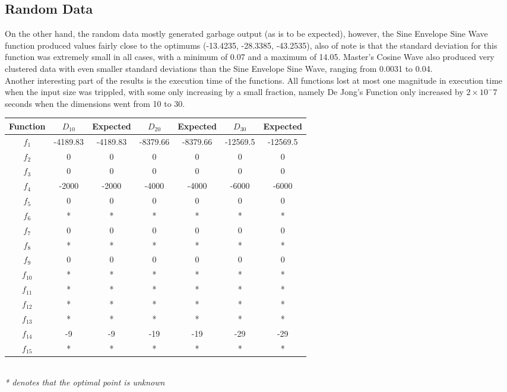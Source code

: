 \documentclass[paper=a4, fontsize=11pt]{scrartcl} %
\numberwithin{equation}{section} %
\numberwithin{figure}{section} %
\numberwithin{table}{section} %
\begin{document}
	\subsection{Random Data}
	On the other hand, the random data mostly generated garbage output (as is to be expected), however, the Sine Envelope Sine Wave function produced values fairly close to the optimums (-13.4235, -28.3385, -43.2535), also of note is that the standard deviation for this function was extremely small in all cases, with a minimum of 0.07 and a maximum of 14.05. Master's Cosine Wave also produced very clustered data with even smaller standard deviations than the Sine Envelope Sine Wave, ranging from 0.0031 to 0.04.\\ Another interesting part of the results is the execution time of the functions. All functions lost at most one magnitude in execution time when the input size was trippled, with some only increasing by a small fraction, namely De Jong's Function only increased by $2\times10^-7$ seconds when the dimensions went from 10 to 30. \\
	
\begin{minipage}{\linewidth}
	\centering
	 \label{tab:title} 
	\begin{tabular}{c|cc|cc|cc}\label{T1}
		Function        & $D_{10}$ & Expected & $D_{20}$ & Expected & $D_{30}$  & Expected \\
		\hline
		$f_1$ 			& -4189.83 & -4189.83 & -8379.66 & -8379.66 & -12569.5 & -12569.5 \\
		$f_2$           & 0 & 0 & 0 & 0 &  0 & 0 \\
		$f_3$           & 0 & 0 & 0 & 0 &  0 & 0 \\
		$f_4$     		& -2000 & -2000 & -4000 & -4000 & -6000 & -6000 \\
		$f_5$           & 0 & 0 & 0 & 0 &  0 & 0 \\
		$f_6$    		& * & * & * & * &  * & * \\
		$f_7$           & 0 & 0 & 0 & 0 &  0 & 0 \\
		$f_8$    		& * & * & * & * &  * & * \\
		$f_9$           & 0 & 0 & 0 & 0 &  0 & 0 \\
		$f_{10}$   		& * & * & * & * &  * & * \\
		$f_{11}$   		& * & * & * & * &  * & * \\
		$f_{12}$   		& * & * & * & * &  * & * \\
		$f_{13}$   		& * & * & * & * &  * & * \\
		$f_{14}$     	& -9 & -9 & -19 & -19 &  -29 & -29 \\
		$f_{15}$     	& * & * & * & * &  * & * \\
	\end{tabular}
	\bigskip\\
	\small
	\textit{* denotes that the optimal point is unknown}
\end{minipage}
\end{document}
